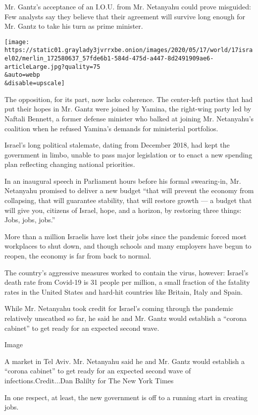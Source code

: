 Mr. Gantz's acceptance of an I.O.U. from Mr. Netanyahu could prove
misguided: Few analysts say they believe that their agreement will
survive long enough for Mr. Gantz to take his turn as prime minister.

\texttt{[image: https://static01.graylady3jvrrxbe.onion/images/2020/05/17/world/17israel02/merlin\_172580637\_57fde6b1-584d-475d-a447-8d2491909ae6-articleLarge.jpg?quality=75\\\&auto=webp\\\&disable=upscale]}

The opposition, for its part, now lacks coherence. The center-left
parties that had put their hopes in Mr. Gantz were joined by Yamina, the
right-wing party led by Naftali Bennett, a former defense minister who
balked at joining Mr. Netanyahu's coalition when he refused Yamina's
demands for ministerial portfolios.

Israel's long political stalemate, dating from December 2018, had kept
the government in limbo, unable to pass major legislation or to enact a
new spending plan reflecting changing national priorities.

In an inaugural speech in Parliament hours before his formal
swearing-in, Mr. Netanyahu promised to deliver a new budget ``that will
prevent the economy from collapsing, that will guarantee stability, that
will restore growth --- a budget that will give you, citizens of Israel,
hope, and a horizon, by restoring three things: Jobs, jobs, jobs.''

More than a million Israelis have lost their jobs since the pandemic
forced most workplaces to shut down, and though schools and many
employers have begun to reopen, the economy is far from back to normal.

The country's aggressive measures worked to contain the virus, however:
Israel's death rate from Covid-19 is 31 people per million, a small
fraction of the fatality rates in the United States and hard-hit
countries like Britain, Italy and Spain.

While Mr. Netanyahu took credit for Israel's coming through the pandemic
relatively unscathed so far, he said he and Mr. Gantz would establish a
``corona cabinet'' to get ready for an expected second wave.

Image

A market in Tel Aviv. Mr. Netanyahu said he and Mr. Gantz would
establish a ``corona cabinet'' to get ready for an expected second wave
of infections.Credit...Dan Balilty for The New York Times

In one respect, at least, the new government is off to a running start
in creating jobs.

